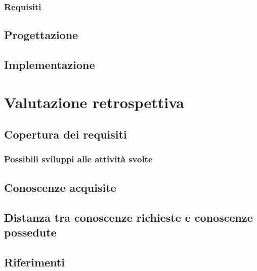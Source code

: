 \subsubsection{Requisiti}
\label{3.2.3}

\subsection{Progettazione}
\label{3.3}

\subsection{Implementazione}
\label{3.4}
\newpage

\section{Valutazione retrospettiva}
\label{4.0}

\subsection{Copertura dei requisiti}
\label{4.1}

\subsubsection{Possibili sviluppi alle attività svolte}
\subsection{Conoscenze acquisite}

\label{4.2}
\subsection{Distanza tra conoscenze richieste e conoscenze possedute}

\label{4.3}
\newpage

\printglossaries
{}
\label{5.0}

\newpage
\subsection*{Riferimenti}
\label{6.0}
\newpage





